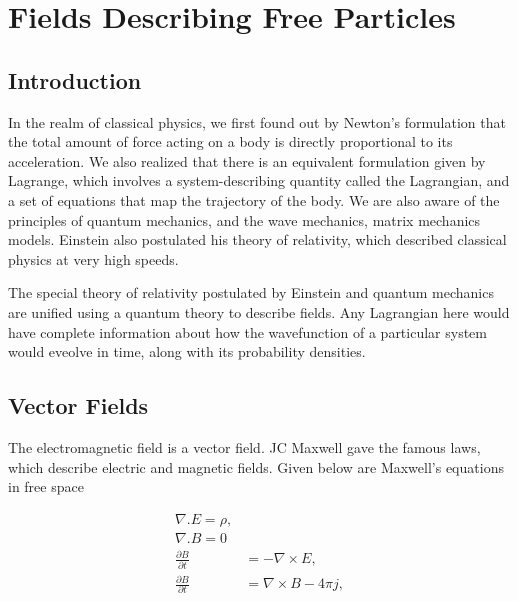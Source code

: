 
\chapter{Fields Describing Free Particles} %

\label{Chapter1} %



\section{Introduction}

In the realm of classical physics, we first found out by Newton's formulation that the total amount of force acting on a body is directly proportional to its acceleration. We also realized that there is an equivalent formulation given by Lagrange, which involves a system-describing quantity called the Lagrangian, and a set of equations that map the trajectory of the body. We are also aware of the principles of quantum mechanics, and the wave mechanics, matrix mechanics models. Einstein also postulated his theory of relativity, which described classical physics at very high speeds.

The special theory of relativity postulated by Einstein and quantum mechanics are unified using a quantum theory to describe fields. Any Lagrangian here would have complete information about how the wavefunction of a particular system would eveolve in time, along with its probability densities.

\section{Vector Fields}
The electromagnetic field is a vector field. JC Maxwell gave the famous laws, which describe electric and magnetic fields. Given below are Maxwell's equations in free space\cite{griffiths13}

\begin{subequations}
\begin{align}
{\nabla}.E=\rho,\\
{\nabla}.B=0\\
\frac{\partial B}{\partial t}&=-\nabla \times E,\\
\frac{\partial B}{\partial t}&=\nabla \times B - 4\pi j,
\end{align}
\end{subequations}

